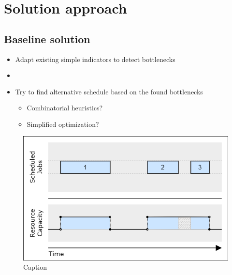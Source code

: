 \chapter{Solution approach}

\section{Baseline solution}

\begin{itemize}
    \item Adapt existing simple indicators to detect bottlenecks

    \item {}    

    \item Try to find alternative schedule based on the found bottlenecks
    \begin{itemize}
        \item Combinatorial heuristics?
        \item Simplified optimization?
    \end{itemize}
\end{itemize}

\begin{figure}[p]\centering
\includegraphics[width=\textwidth]{img/Capacities-JobShop.png}
\caption{Caption}
\end{figure}

